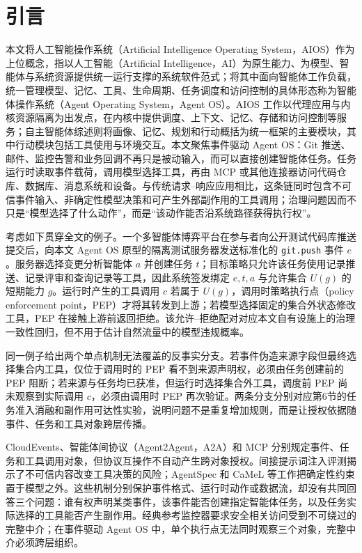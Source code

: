 \section*{引言}\label{sec:introduction-v11}

本文将人工智能操作系统（Artificial Intelligence Operating System，AIOS）作为上位概念，指以人工智能（Artificial Intelligence，AI）为原生能力、为模型、智能体与系统资源提供统一运行支撑的系统软件范式；将其中面向智能体工作负载，统一管理模型、记忆、工具、生命周期、任务调度和访问控制的具体形态称为智能体操作系统（Agent Operating System，Agent OS）。AIOS 工作以代理应用与内核资源隔离为出发点，在内核中提供调度、上下文、记忆、存储和访问控制等服务\cite{aios}；自主智能体综述则将画像、记忆、规划和行动概括为统一框架的主要模块，其中行动模块包括工具使用与环境交互\cite{agent-survey}。本文聚焦事件驱动 Agent OS：Git 推送、邮件、监控告警和业务回调不再只是被动输入，而可以直接创建智能体任务。任务运行时读取事件载荷，调用模型选择工具，再由 MCP 或其他连接器访问代码仓库、数据库、消息系统和设备。与传统请求--响应应用相比，这条链同时包含不可信事件输入、非确定性模型决策和可产生外部副作用的工具调用；治理问题因而不只是“模型选择了什么动作”，而是“该动作能否沿系统路径获得执行权”。

考虑如下贯穿全文的例子。一个多智能体博弈平台在参与者向公开测试代码库推送提交后，向本文 Agent OS 原型的隔离测试服务器发送标准化的 \texttt{git.push} 事件 $e$。服务器选择变更分析智能体 $a$ 并创建任务 $t$；目标策略只允许该任务使用记录推送、记录评审和查询记录等工具，因此系统签发绑定 $e,t,a$ 与允许集合 $U(g)$ 的短期能力 $g$。运行时产生的工具调用 $c$ 若属于 $U(g)$，调用时策略执行点（policy enforcement point，PEP）才将其转发到上游；若模型选择固定的集合外状态修改工具，PEP 在接触上游前返回拒绝。该允许--拒绝配对对应本文自有设施上的治理一致性回归，但不用于估计自然流量中的模型违规概率。

同一例子给出两个单点机制无法覆盖的反事实分支。若事件伪造来源字段但最终选择集合内工具，仅位于调用时的 PEP 看不到来源声明权，必须由任务创建前的 PEP 阻断；若来源与任务均已获准，但运行时选择集合外工具，调度前 PEP 尚未观察到实际调用 $c$，必须由调用时 PEP 再次验证。两条分支分别对应第6节的任务准入消融和副作用可达性实验，说明问题不是重复增加规则，而是让授权依据随事件、任务和工具对象跨层传播。

CloudEvents、智能体间协议（Agent2Agent，A2A）和 MCP 分别规定事件、任务和工具调用对象\cite{cloudevents,a2a,mcp}，但协议互操作不自动产生跨对象授权。间接提示词注入评测揭示了不可信内容改变工具决策的风险\cite{indirect-pi,injecagent,agentdojo,toolemu}；AgentSpec 和 CaMeL 等工作把确定性约束置于模型之外\cite{agentspec,camel}。这些机制分别保护事件格式、运行时动作或数据流，却没有共同回答三个问题：谁有权声明某类事件，该事件能否创建指定智能体任务，以及任务实际选择的工具能否产生副作用。经典参考监控器要求安全相关访问受到不可绕过的完整中介\cite{reference-monitor,saltzer-schroeder}；在事件驱动 Agent OS 中，单个执行点无法同时观察三个对象，完整中介必须跨层组织。

